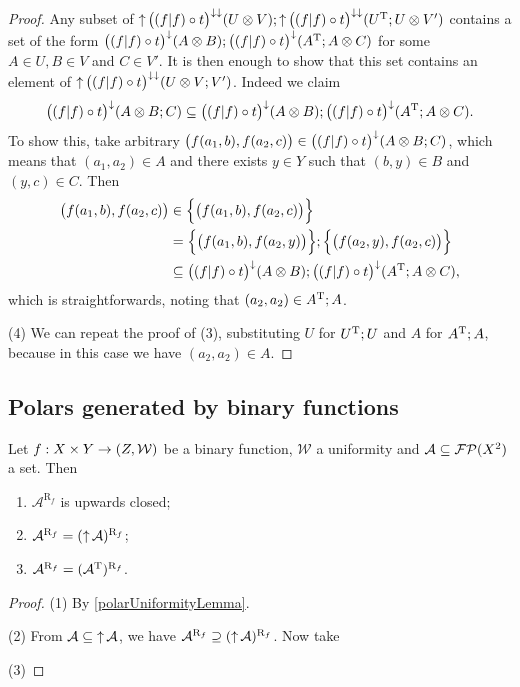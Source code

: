 \begin{proof}
Any subset of $\operatorname{\uparrow}\big((f|f)\circ t \big)^{\downarrow\downarrow}(U\otimes V);\operatorname{\uparrow}\big((f|f)\circ t \big)^{\downarrow\downarrow}(U^{\mathrm{T}};U\otimes V')$ contains a set of the form $\big((f|f)\circ t \big)^{\downarrow}(A\otimes B);\big((f|f)\circ t \big)^{\downarrow}(A^{\mathrm{T}};A\otimes C)$ for some $A\in U, B\in V$ and $C\in V'$. It is then enough to show that this set contains an element of $\operatorname{\uparrow}\big((f|f)\circ t \big)^{\downarrow\downarrow}(U\otimes V;V')$. Indeed we claim
\[ \big((f|f)\circ t \big)^{\downarrow}(A\otimes B;C) \subseteq \big((f|f)\circ t \big)^{\downarrow}(A\otimes B);\big((f|f)\circ t \big)^{\downarrow}(A^{\mathrm{T}};A\otimes C). \]
To show this, take arbitrary $\big(f(a_1, b), f(a_2, c)\big) \in \big((f|f)\circ t \big)^{\downarrow}(A\otimes B;C)$, which means that $(a_1, a_2)\in A$ and there exists $y\in Y$ such that $(b,y)\in B$ and $(y,c)\in C$. Then
\begin{align*}
\big(f(a_1, b), f(a_2, c)\big) &\in \Big\{\big(f(a_1, b),f(a_2, c) \big)\Big\} \\
&= \Big\{\big(f(a_1, b),f(a_2, y) \big)\Big\}; \Big\{\big(f(a_2, y), f(a_2, c)\big)\Big\} \\
&\subseteq \big((f|f)\circ t \big)^{\downarrow}(A\otimes B);\big((f|f)\circ t \big)^{\downarrow}(A^{\mathrm{T}};A\otimes C),
\end{align*}
which is straightforwards, noting that $(a_2,a_2)\in A^{\mathrm{T}}; A$.

(4) We can repeat the proof of (3), substituting $U$ for $U^{\mathrm{T}};U$ and $A$ for $A^{\mathrm{T}};A$, because in this case we have $(a_2, a_2)\in A$.
\end{proof}

\subsection{Polars generated by binary functions}
\begin{lemma}
Let $f: X\times Y\to \left( Z, \mathcal{W} \right)$ be a binary function, $\mathcal{W}$ a uniformity and $\mathcal{A}\subseteq \operatorname{\mathcal{FP}}(X^2)$ a set. Then
\begin{enumerate}
\item $\mathcal{A}^{\mathrm{R}_{f}}$ is upwards closed;
\item $\mathcal{A}^{\mathrm{R}_{f}} = (\operatorname{\uparrow} \mathcal{A})^{\mathrm{R}_{f}}$;
\item $\mathcal{A}^{\mathrm{R}_{f}} = (\mathcal{A}^{\mathrm{T}})^{\mathrm{R}_{f}}$.
\end{enumerate}
\end{lemma}
\begin{proof}
(1) By \ref{polarUniformityLemma}.

(2) From $\mathcal{A} \subseteq \operatorname{\uparrow} \mathcal{A}$, we have $\mathcal{A}^{\mathrm{R}_{f}} \supseteq (\operatorname{\uparrow} \mathcal{A})^{\mathrm{R}_{f}}$. Now take 

(3)
\end{proof}

